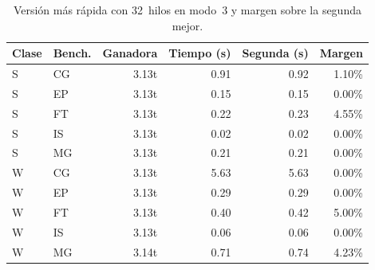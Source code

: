 \begin{table}[htbp]
\centering
\small
\begin{tabular}{llrrrr}
\hline
Clase & Bench. & Ganadora & Tiempo (s) & Segunda (s) & Margen \\
\hline
S & CG & 3.13t & 0.91 & 0.92 & 1.10\% \\
S & EP & 3.13t & 0.15 & 0.15 & 0.00\% \\
S & FT & 3.13t & 0.22 & 0.23 & 4.55\% \\
S & IS & 3.13t & 0.02 & 0.02 & 0.00\% \\
S & MG & 3.13t & 0.21 & 0.21 & 0.00\% \\
W & CG & 3.13t & 5.63 & 5.63 & 0.00\% \\
W & EP & 3.13t & 0.29 & 0.29 & 0.00\% \\
W & FT & 3.13t & 0.40 & 0.42 & 5.00\% \\
W & IS & 3.13t & 0.06 & 0.06 & 0.00\% \\
W & MG & 3.14t & 0.71 & 0.74 & 4.23\% \\
\hline
\end{tabular}
\caption{Versión más rápida con 32~hilos en modo~3 y margen sobre la segunda mejor.}
\label{tab:versiones-ganador-t32-mode3}
\end{table}
